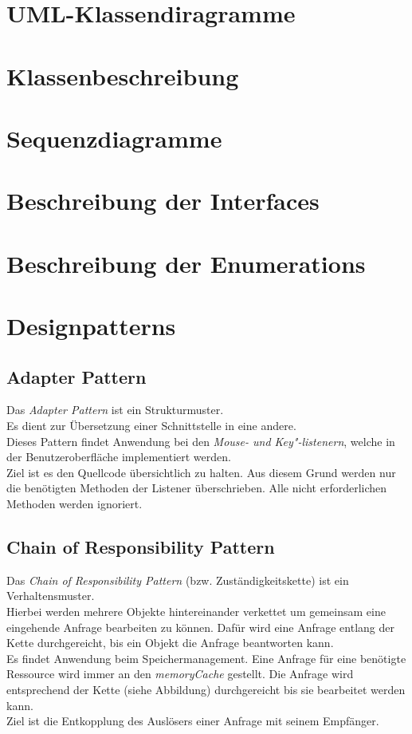 \documentclass[10pt]{scrreprt}
\begin{document}
\chapter{UML-Klassendiragramme}

\chapter{Klassenbeschreibung}

\chapter{Sequenzdiagramme}

\chapter{Beschreibung der Interfaces}

\chapter{Beschreibung der Enumerations}

\chapter{Designpatterns}
\section{Adapter Pattern}
Das \textit{Adapter Pattern} ist ein Strukturmuster. \\
Es dient zur Übersetzung einer Schnittstelle in eine andere. \\ Dieses Pattern findet Anwendung bei den \textit{Mouse- und Key"-listenern}, welche in der Benutzeroberfläche implementiert werden. \\ Ziel ist es den Quellcode übersichtlich zu halten. Aus diesem Grund werden nur die benötigten Methoden der Listener überschrieben. Alle nicht erforderlichen Methoden werden ignoriert.

\section{Chain of Responsibility Pattern}
Das \textit{Chain of Responsibility Pattern} (bzw. Zuständigkeitskette) ist ein Verhaltensmuster. \\
Hierbei werden mehrere Objekte hintereinander verkettet um gemeinsam eine eingehende Anfrage bearbeiten zu können. Dafür wird eine Anfrage entlang der Kette durchgereicht, bis ein Objekt die Anfrage beantworten kann. \\ Es findet Anwendung beim Speichermanagement. Eine Anfrage für eine benötigte Ressource wird immer an den \textit{memoryCache} gestellt. Die Anfrage wird entsprechend der Kette (siehe Abbildung) durchgereicht bis sie bearbeitet werden kann. \\ Ziel ist  die Entkopplung des Auslösers einer Anfrage mit seinem Empfänger.
\end{document}
